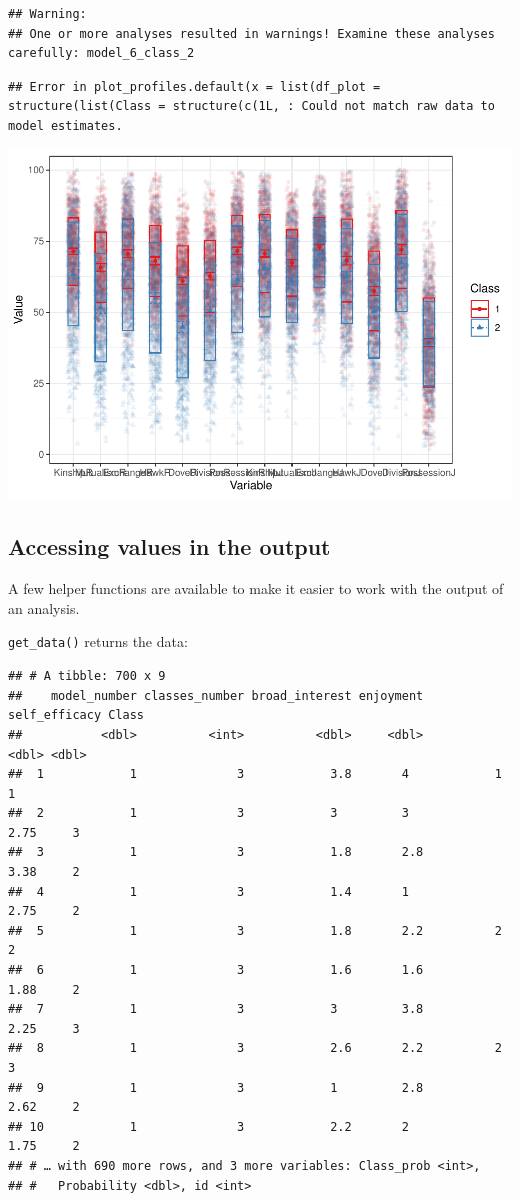 \documentclass[man]{apa6}
\begin{document}
\begin{verbatim}
## Warning: 
## One or more analyses resulted in warnings! Examine these analyses carefully: model_6_class_2
\end{verbatim}

\begin{verbatim}
## Error in plot_profiles.default(x = list(df_plot = structure(list(Class = structure(c(1L, : Could not match raw data to model estimates.
\end{verbatim}

\includegraphics{paper_files/figure-latex/m6p2-mclust-1.pdf}

\hypertarget{accessing-values-in-the-output}{%
\subsection{Accessing values in the output}\label{accessing-values-in-the-output}}

A few helper functions are available to make it easier to work with the output
of an analysis.

\texttt{get\_data()} returns the data:

\begin{verbatim}
## # A tibble: 700 x 9
##    model_number classes_number broad_interest enjoyment self_efficacy Class
##           <dbl>          <int>          <dbl>     <dbl>         <dbl> <dbl>
##  1            1              3            3.8       4            1        1
##  2            1              3            3         3            2.75     3
##  3            1              3            1.8       2.8          3.38     2
##  4            1              3            1.4       1            2.75     2
##  5            1              3            1.8       2.2          2        2
##  6            1              3            1.6       1.6          1.88     2
##  7            1              3            3         3.8          2.25     3
##  8            1              3            2.6       2.2          2        3
##  9            1              3            1         2.8          2.62     2
## 10            1              3            2.2       2            1.75     2
## # … with 690 more rows, and 3 more variables: Class_prob <int>,
## #   Probability <dbl>, id <int>
\end{verbatim}
\end{document}
